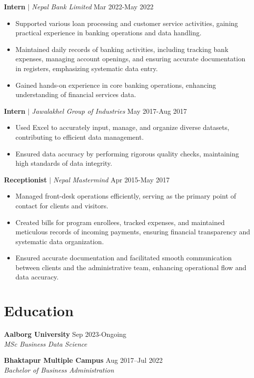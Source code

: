 \documentclass[10pt, letterpaper]{article}
\begin{document}
\vspace{4pt}
\noindent\textbf{Intern} $|$ \textit{Nepal Bank Limited} \hfill Mar 2022-May 2022\\
\begin{itemize}[leftmargin=0.15in, topsep=0pt, partopsep=0pt, itemsep=-2pt]
    \item Supported various loan processing and customer service activities, gaining practical experience in banking operations and data handling.
    \item Maintained daily records of banking activities, including tracking bank expenses, managing account openings, and ensuring accurate documentation in registers, emphasizing systematic data entry.
    \item Gained hands-on experience in core banking operations, enhancing understanding of financial services data.
\end{itemize}
\vspace{4pt}
\noindent\textbf{Intern} $|$ \textit{Jawalakhel Group of Industries} \hfill May 2017-Aug 2017\\
\begin{itemize}[leftmargin=0.15in, topsep=0pt, partopsep=0pt, itemsep=-2pt]
    \item Used Excel to accurately input, manage, and organize diverse datasets, contributing to efficient data management.
    \item Ensured data accuracy by performing rigorous quality checks, maintaining high standards of data integrity.
\end{itemize}
\vspace{4pt}
\noindent\textbf{Receptionist} $|$ \textit{Nepal Mastermind} \hfill Apr 2015-May 2017\\
\begin{itemize}[leftmargin=0.15in, topsep=0pt, partopsep=0pt, itemsep=-2pt]
    \item Managed front-desk operations efficiently, serving as the primary point of contact for clients and visitors.
    \item Created bills for program enrollees, tracked expenses, and maintained meticulous records of incoming payments, ensuring financial transparency and systematic data organization.
    \item Ensured accurate documentation and facilitated smooth communication between clients and the administrative team, enhancing operational flow and data accuracy.
\end{itemize}
\vspace{4pt}


\section{Education}
\noindent\textbf{Aalborg University} \hfill Sep 2023-Ongoing\\
\textit{MSc Business Data Science}\\
\vspace{2pt}

\noindent\textbf{Bhaktapur Multiple Campus} \hfill Aug 2017–Jul 2022\\
\textit{Bachelor of Business Administration}\\
\vspace{2pt}
\end{document}
